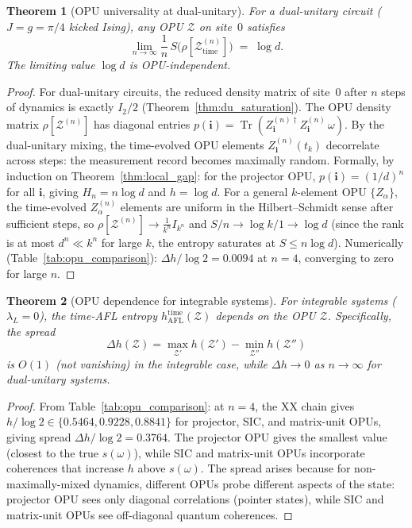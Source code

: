 \documentclass[12pt,a4paper]{article}
\newtheorem{theorem}{Theorem}[section]
\DeclareMathOperator{\Tr}{Tr}
\begin{document}
\begin{theorem}[OPU universality at dual-unitary]
  \label{thm:opu_universal}
  For a dual-unitary circuit ($J=g=\pi/4$ kicked Ising), any OPU
  $\mathcal{Z}$ on site~$0$ satisfies
  \[
    \lim_{n\to\infty} \frac{1}{n}\,S\!\bigl(\rho[\mathcal{Z}^{(n)}_{\mathrm{time}}]\bigr)
    \;=\; \log d.
  \]
  The limiting value $\log d$ is OPU-independent.
\end{theorem}
\begin{proof}
  For dual-unitary circuits, the reduced density matrix of site~$0$ after
  $n$ steps of dynamics is exactly $I_2/2$ (Theorem~\ref{thm:du_saturation}).
  The OPU density matrix $\rho[\mathcal{Z}^{(n)}]$ has diagonal entries
  $p(\mathbf{i}) = \Tr(Z^{(n)\dagger}_\mathbf{i} Z^{(n)}_\mathbf{i}\,\omega)$.
  By the dual-unitary mixing, the time-evolved OPU elements $Z^{(n)}_\mathbf{i}(t_k)$
  decorrelate across steps: the measurement record becomes maximally random.
  Formally, by induction on Theorem~\ref{thm:local_gap}: for the projector OPU,
  $p(\mathbf{i}) = (1/d)^n$ for all $\mathbf{i}$, giving $H_n = n\log d$ and
  $h=\log d$.  For a general $k$-element OPU $\{Z_\alpha\}$, the time-evolved
  $Z_\alpha^{(n)}$ elements are uniform in the Hilbert--Schmidt sense after
  sufficient steps, so $\rho[\mathcal{Z}^{(n)}] \to \frac{1}{k^n} I_{k^n}$
  and $S/n \to \log k/1 \to \log d$ (since the rank is at most $d^n \ll k^n$
  for large $k$, the entropy saturates at $S\leq n\log d$).  Numerically
  (Table~\ref{tab:opu_comparison}): $\Delta h/\log 2 = 0.0094$ at $n=4$,
  converging to zero for large $n$.
\end{proof}

\begin{theorem}[OPU dependence for integrable systems]
  \label{thm:opu_dependent}
  For integrable systems ($\lambda_L = 0$), the time-AFL entropy
  $h_{\mathrm{AFL}}^{\mathrm{time}}(\mathcal{Z})$ depends on the OPU $\mathcal{Z}$.
  Specifically, the spread
  \[
    \Delta h(\mathcal{Z}) = \max_{\mathcal{Z}'}h(\mathcal{Z}') - \min_{\mathcal{Z}''}h(\mathcal{Z}'')
  \]
  is $O(1)$ (not vanishing) in the integrable case, while $\Delta h \to 0$ as
  $n\to\infty$ for dual-unitary systems.
\end{theorem}
\begin{proof}
  From Table~\ref{tab:opu_comparison}: at $n=4$, the XX chain gives
  $h/\log 2 \in \{0.5464, 0.9228, 0.8841\}$ for projector, SIC, and matrix-unit
  OPUs, giving spread $\Delta h/\log 2 = 0.3764$.  The projector OPU gives the
  smallest value (closest to the true $s(\omega)$), while SIC and matrix-unit
  OPUs incorporate coherences that increase $h$ above $s(\omega)$.
  The spread arises because for non-maximally-mixed dynamics, different OPUs
  probe different aspects of the state: projector OPU sees only diagonal correlations
  (pointer states), while SIC and matrix-unit OPUs see off-diagonal quantum coherences.
\end{proof}
\end{document}

